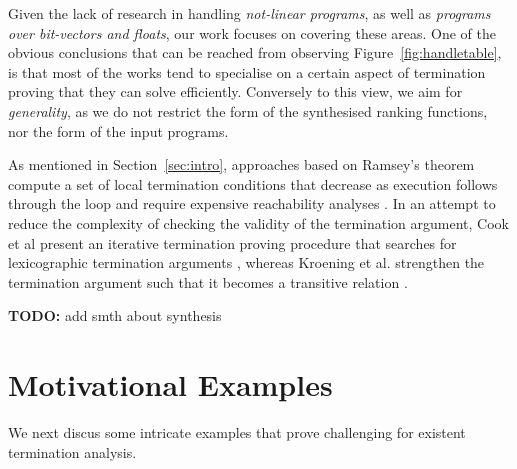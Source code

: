 \documentclass[preprint]{sigplanconf}
\theoremstyle{definition}
\newcommand{\todo}[1]{{\bf TODO:} #1}
\begin{document}
Given the lack of research in handling \emph{not-linear programs}, as well as \emph{programs over bit-vectors and floats},  
our work focuses on covering these areas. 
One of the obvious conclusions that can be reached from observing Figure~\ref{fig:handletable}, 
is that most of the works tend to specialise on a certain aspect of termination proving that they can solve efficiently. 
Conversely to this view, we aim for \emph{generality}, as we do not restrict the form of the synthesised ranking functions, nor the form of the input programs.


As mentioned in Section~\ref{sec:intro}, approaches based on Ramsey's theorem compute a set of local termination conditions that decrease as execution follows through the loop
and require expensive reachability analyses
\cite{DBLP:conf/lpe/CodishG03,DBLP:conf/lics/PodelskiR04,DBLP:conf/pldi/CookPR06}.
In an attempt to reduce the complexity of checking the validity of the termination argument, 
Cook et al present an iterative termination proving procedure that searches for 
lexicographic termination arguments \cite{DBLP:conf/tacas/CookSZ13}, 
whereas Kroening et al. strengthen the termination argument such that it becomes a transitive relation \cite{DBLP:conf/cav/KroeningSTW10}.

\todo{add smth about synthesis}







\section{Motivational Examples} \label{sec:motivation}
We next discus some intricate examples that prove challenging for existent termination analysis.
\end{document}
